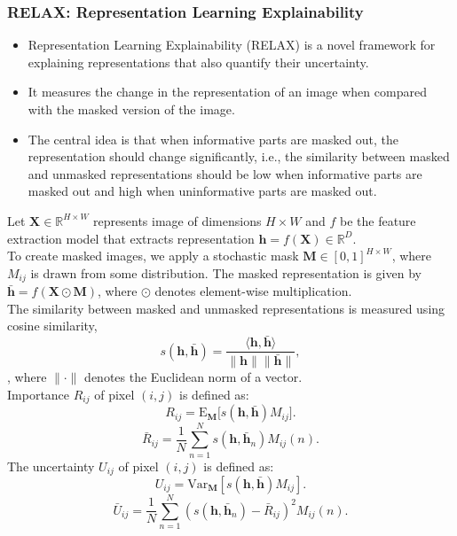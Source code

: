 \subsubsection{RELAX: Representation Learning Explainability}
\begin{itemize}
    \item Representation Learning Explainability (RELAX)\cite{chen2020simple} is a novel framework for explaining representations that also quantify their uncertainty.
    \item It measures the change in the representation of an image when compared with the masked version of the image.
    \item The central idea is that when informative parts are masked out, the representation should change significantly, i.e., the similarity between masked and unmasked representations should be low when informative parts are masked out and high when uninformative parts are masked out.
\end{itemize} 
Let $\mathbf{X}\in \mathbb{R}^{H\times W}$ represents image of dimensions $H\times W$ and $f$ be the feature extraction model that extracts representation $\mathbf{h} = f(\mathbf{X}) \in \mathbb{R}^D$. \\
To create masked images, we apply a stochastic mask $\mathbf{M}\in [0, 1]^{H\times W}$, where $M_{ij}$ is drawn from some distribution.
The masked representation is given by $\bar{\mathbf{h}} = f(\mathbf{X}\odot \mathbf{M})$, where $\odot$ denotes element-wise multiplication.\\
The similarity between masked and unmasked representations is measured using cosine similarity, 
\begin{equation*}\label{eq:sim}
    s(\mathbf{h}, \bar{\mathbf{h}}) = \frac{\langle \mathbf{h}, \bar{\mathbf{h}}\rangle }{\lVert\mathbf{h}\rVert \lVert\bar{\mathbf{h}}\rVert},
\end{equation*}, where $\lVert\cdot\rVert$ denotes the Euclidean norm of a vector. \\
Importance $R_{ij}$ of pixel $(i,j)$ is defined as:
\begin{equation*}\label{eq:rel1}
    R_{ij} = \mathrm{E}_{\mathbf{M}}\big[s(\mathbf{h}, \bar{\mathbf{h}})M_{ij}\big].
\end{equation*}
\begin{equation*}\label{eq:rel2}
    \bar{R}_{ij} = \frac{1}{N}\sum\limits_{n=1}^N s(\mathbf{h}, \bar{\mathbf{h}}_n)M_{ij}(n).
\end{equation*}
The uncertainty $U_{ij}$ of pixel $(i,j)$ is defined as:
\begin{equation*}\label{eq:unc1}
    U_{ij} = \mathrm{Var}_{\mathbf{M}} [s(\mathbf{h}, \bar{\mathbf{h}})M_{ij}].
\end{equation*}
\begin{equation*}\label{eq:unc2}
    \bar{U}_{ij} = \frac{1}{N}\sum\limits_{n=1}^N (s(\mathbf{h}, \bar{\mathbf{h}}_n) - \bar{R}_{ij})^2 M_{ij}(n).
\end{equation*}

